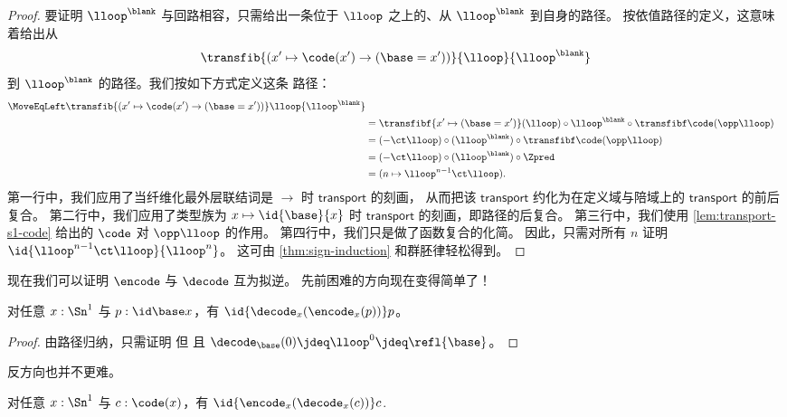 \begin{proof}
要证明 $\lloop^{\blank}$ 与回路相容，只需给出一条位于 $\lloop$ 之上的、从 $\lloop^{\blank}$ 到自身的路径。
按依值路径的定义，这意味着给出从
\[\transfib {(x' \mapsto \code(x') \rightarrow (\base=x'))} {\lloop} {\lloop^{\blank}}\]
到 $\lloop^{\blank}$ 的路径。我们按如下方式定义这条
路径：
\begin{align*}
  \MoveEqLeft \transfib {(x' \mapsto \code(x') \rightarrow (\base=x'))} \lloop {\lloop^{\blank}}\\
&= \transfibf {x'\mapsto (\base=x')}(\lloop) \circ {\lloop^{\blank}} \circ \transfibf \code ({\opp \lloop}) \\
&= (- \ct \lloop) \circ (\lloop^{\blank}) \circ \transfibf \code ({\opp \lloop}) \\
&= (- \ct \lloop) \circ (\lloop^{\blank}) \circ \Zpred \\
&= (n \mapsto \lloop^{n - 1} \ct \lloop).
\end{align*}
第一行中，我们应用了当纤维化最外层联结词是 $\rightarrow$ 时 $\mathsf{transport}$ 的刻画，
从而把该 $\mathsf{transport}$ 约化为在定义域与陪域上的 $\mathsf{transport}$ 的前后复合。
第二行中，我们应用了类型族为 $x\mapsto \id{\base}{x}$ 时 $\mathsf{transport}$ 的刻画，即路径的后复合。
第三行中，我们使用 \cref{lem:transport-s1-code} 给出的 $\code$ 对 $\opp \lloop$ 的作用。
第四行中，我们只是做了函数复合的化简。
因此，只需对所有 $n$ 证明 $\id{\lloop^{n - 1} \ct \lloop}{\lloop^{n}}$。
这可由 \cref{thm:sign-induction} 和群胚律轻松得到。
\end{proof}

现在我们可以证明 $\encode$ 与 $\decode$ 互为拟逆。
先前困难的方向现在变得简单了！

\begin{lem} \label{lem:s1-decode-encode}
对任意 $x: \Sn ^1$ 与 $p : \id \base x$，有 $\id
{\decode_x({{\encode_x(p)}})} p$。
\end{lem}

\begin{proof}
由路径归纳，只需证明
但
且 $\decode_{\base}(0) \jdeq \lloop^ 0 \jdeq \refl{\base}$。
\end{proof}

反方向也并不更难。

\begin{lem} \label{lem:s1-encode-decode} 对任意
$x: \Sn ^1$ 与 $c : \code(x)$，有 $\id
{\encode_x({{\decode_x(c)}})} c$.
\end{lem}

